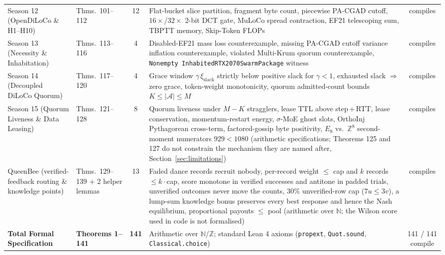 \documentclass[11pt,a4paper]{article}
\begin{document}
\begin{table}[ht!]
{\begin{tabular}{@{}llcp{6.7cm}c@{}}
Season 12 (OpenDiLoCo \& H1--H10) & Thms.\ 101--112 & 12 & Flat-bucket slice partition, fragment byte count, piecewise PA-CGAD cutoff, $16\times$/$32\times$ 2-bit DCT gate, MuLoCo spread contraction, EF21 telescoping sum, TBPTT memory, Skip-Token FLOPs & compiles \\
Season 13 (Necessity \& Inhabitation) & Thms.\ 113--116 & 4 & Disabled-EF21 mass loss counterexample, missing PA-CGAD cutoff variance inflation counterexample, violated Multi-Krum quorum counterexample, \texttt{Nonempty InhabitedRTX2070SwarmPackage} witness & compiles \\
Season 14 (Decoupled DiLoCo Quorum) & Thms.\ 117--120 & 4 & Grace window $\gamma\,\xi_{\text{slack}}$ strictly below positive slack for $\gamma < 1$, exhausted slack $\Rightarrow$ zero grace, token-weight monotonicity, quorum admitted-count bounds $K \le |\mathcal{A}| \le M$ & compiles \\
Season 15 (Quorum Liveness \& Data Leasing) & Thms.\ 121--128 & 8 & Quorum liveness under $M-K$ stragglers, lease TTL above step\,+\,RTT, lease conservation, momentum-restart energy, $\sigma$-MoE ghost slots, OrthoInj Pythagorean cross-term, factored-gossip byte positivity, $E_8$ vs.\ $\mathbb{Z}^8$ second-moment numerators $929 < 1080$ (arithmetic specifications; Theorems 125 and 127 do not constrain the mechanism they are named after, Section~\ref{sec:limitations}) & compiles \\
QueenBee (verified-feedback routing \& knowledge points) & Thms.\ 129--139 + 2 helper lemmas & 13 & Faded dance records recruit nobody, per-record weight $\le$ cap and $k$ records $\le k\cdot$cap, score monotone in verified successes and antitone in padded trials, unverified outcomes never move the counts, $30\%$ unverified-row cap ($7u \le 3v$), a lump-sum knowledge bonus preserves every best response and hence the Nash equilibrium, proportional payouts $\le$ pool (arithmetic over $\mathbb{N}$; the Wilson score used in code is not formalised) & compiles \\
\midrule
\textbf{Total Formal Specification} & \textbf{Theorems 1--141} & \textbf{141} & Arithmetic over $\mathbb{N}$/$\mathbb{Z}$; standard Lean 4 axioms (\texttt{propext}, \texttt{Quot.sound}, \texttt{Classical.choice}) & 141 / 141 compile \\
\bottomrule
\end{tabular}%
}
\end{table}

\end{document}
